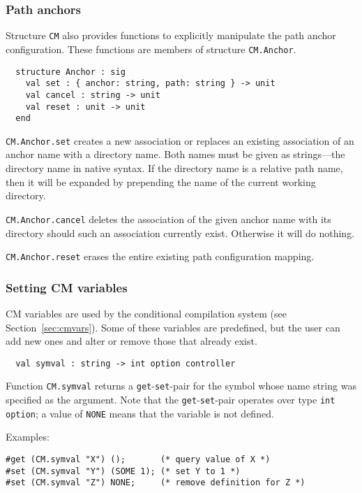 \documentclass{article}
\begin{document}
\subsubsection*{Path anchors}

Structure {\tt CM} also provides functions to explicitly manipulate
the path anchor configuration.  These functions are members of
structure {\tt CM.Anchor}.

\begin{verbatim}
  structure Anchor : sig
    val set : { anchor: string, path: string } -> unit
    val cancel : string -> unit
    val reset : unit -> unit
  end
\end{verbatim}

{\tt CM.Anchor.set} creates a new association or replaces an existing
association of an anchor name with a directory name.  Both names must
be given as strings---the directory name in native syntax.  If the
directory name is a relative path name, then it will be expanded by
prepending the name of the current working directory.

{\tt CM.Anchor.cancel} deletes the association of the given anchor name
with its directory should such an association currently exist.
Otherwise it will do nothing.

{\tt CM.Anchor.reset} erases the entire existing path configuration
mapping.

\subsubsection*{Setting CM variables}

CM variables are used by the conditional compilation system (see
Section~\ref{sec:cmvars}).   Some of these variables are predefined,
but the user can add new ones and alter or remove those that already
exist.

\begin{verbatim}
  val symval : string -> int option controller
\end{verbatim}

Function {\tt CM.symval} returns a {\tt get}-{\tt set}-pair for the
symbol whose name string was specified as the argument.  Note that the
{\tt get}-{\tt set}-pair operates over type {\tt int option}; a value
of {\tt NONE} means that the variable is not defined.

\noindent Examples:
\begin{verbatim}
#get (CM.symval "X") ();       (* query value of X *)
#set (CM.symval "Y") (SOME 1); (* set Y to 1 *)
#set (CM.symval "Z") NONE;     (* remove definition for Z *)
\end{verbatim}
\end{document}

